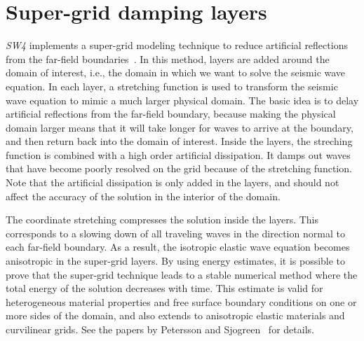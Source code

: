 \documentclass[11pt]{report}
\begin{document}
\section{Super-grid damping layers}\label{sec:supergrid}

\emph{SW4} implements a super-grid modeling technique to reduce artificial reflections from the
far-field boundaries~\cite{AppCol-09, PetSjo-14}. In this method, layers are added around the domain
of interest, i.e., the domain in which we want to solve the seismic wave equation. In each layer, a
stretching function is used to transform the seismic wave equation to mimic a much larger physical
domain. The basic idea is to delay artificial reflections from the far-field boundary, because
making the physical domain larger means that it will take longer for waves to arrive at the
boundary, and then return back into the domain of interest. Inside the layers, the streching
function is combined with a high order artificial dissipation. It damps out waves that have become
poorly resolved on the grid because of the stretching function. Note that the artificial dissipation
is only added in the layers, and should not affect the accuracy of the solution in the interior of
the domain.

The coordinate stretching compresses the solution inside the layers. This corresponds to a slowing
down of all traveling waves in the direction normal to each far-field boundary. As a result, the
isotropic elastic wave equation becomes anisotropic in the super-grid layers. By using energy
estimates, it is possible to prove that the super-grid technique leads to a stable numerical method
where the total energy of the solution decreases with time. This estimate is valid for heterogeneous
material properties and free surface boundary conditions on one or more sides of the domain, and
also extends to anisotropic elastic materials and curvilinear grids. See the papers by Petersson and
Sjogreen~\cite{PetSjo-14, PetSjo-14b} for details.
\end{document}
